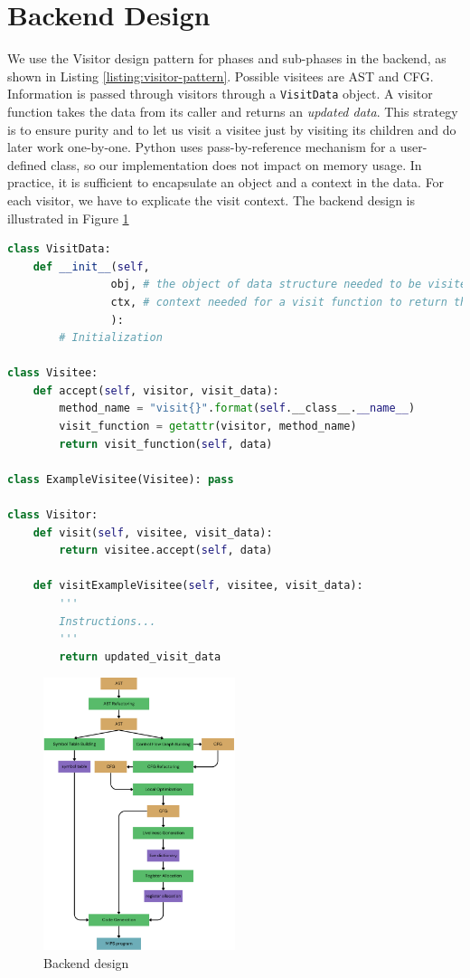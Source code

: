 \section{Backend Design}
We use the Visitor design pattern for phases and sub-phases in the backend, as shown in Listing \ref{listing:visitor-pattern}. Possible visitees are AST and CFG. Information is passed through visitors through a \texttt{VisitData} object. A visitor function takes the data from its caller and returns an \textit{updated data}. This strategy is to ensure purity and to let us visit a visitee just by visiting its children and do later work one-by-one. Python uses pass-by-reference mechanism for a user-defined class, so our implementation does not impact on memory usage. In practice, it is sufficient to encapsulate an object and a context in the data. For each visitor, we have to explicate the visit context. The backend design is illustrated in Figure \ref{figure:backend-design}

\begin{lstlisting}[language = python, caption={Visitor pattern}, label={listing:visitor-pattern}]
class VisitData:
    def __init__(self, 
                obj, # the object of data structure needed to be visited
                ctx, # context needed for a visit function to return the complete updated data
                ):
        # Initialization

class Visitee:
    def accept(self, visitor, visit_data):
        method_name = "visit{}".format(self.__class__.__name__)
        visit_function = getattr(visitor, method_name)
        return visit_function(self, data)

class ExampleVisitee(Visitee): pass

class Visitor:
    def visit(self, visitee, visit_data):
        return visitee.accept(self, data)
    
    def visitExampleVisitee(self, visitee, visit_data):
        '''
        Instructions...
        '''
        return updated_visit_data
\end{lstlisting}

\begin{figure}
    \centering
    \includegraphics[width = 0.5\textwidth]{img/backend-design}
    \caption{Backend design}
    \label{figure:backend-design}
\end{figure}

